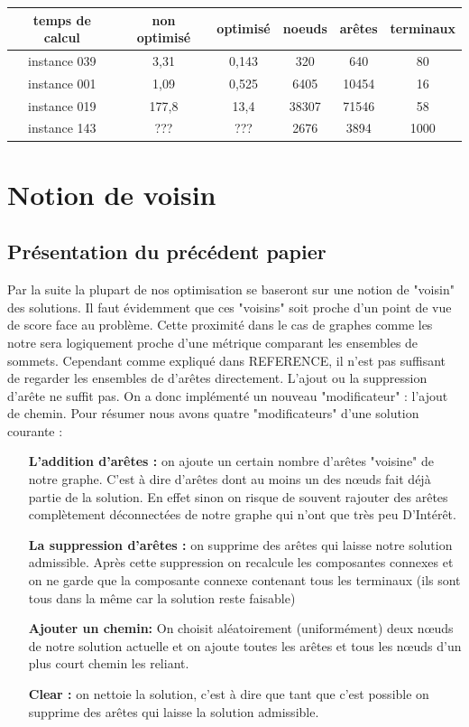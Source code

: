 \documentclass[10pt,a4paper]{article}
\begin{document}
\begin{tabular}{|c|c|c|c|c|c|}
\hline 
temps de calcul & non optimisé & optimisé & noeuds & arêtes & terminaux \\ 
\hline 
instance 039 & 3,31 & 0,143 & 320 & 640 & 80 \\ 
\hline 
instance 001 & 1,09 & 0,525 & 6405 & 10454 & 16 \\ 
\hline 
instance 019 & 177,8 & 13,4 & 38307 & 71546 & 58 \\ 
\hline 
instance 143 & ???   & ???  & 2676 & 3894 & 1000 \\
\hline 
\end{tabular} 

\section{Notion de voisin}




\subsection{Présentation du précédent papier}
Par la suite la plupart de nos optimisation se baseront sur une notion de "voisin" des solutions. Il faut évidemment que ces "voisins" soit proche d'un point de vue de score face au problème. Cette proximité dans le cas de graphes comme les notre sera logiquement proche d'une métrique comparant les ensembles de sommets. Cependant comme expliqué dans REFERENCE, il n'est pas suffisant de regarder les ensembles de d’arêtes directement. L'ajout ou la suppression d’arête ne suffit pas. On a donc implémenté un nouveau "modificateur" : l'ajout de chemin. 
Pour résumer nous avons quatre "modificateurs" d'une solution courante :
\begin{itemize}   
\item[\textbf{L'addition  d’arêtes : }] on ajoute un certain nombre d'arêtes "voisine" de notre graphe. C'est à dire d'arêtes dont au moins un des nœuds fait déjà partie de la solution. En effet sinon on risque de souvent rajouter des arêtes complètement déconnectées de notre graphe qui n'ont que très peu D’Intérêt.
\item[\textbf{La suppression d’arêtes : }] on supprime des arêtes qui laisse notre solution admissible. Après cette suppression on recalcule les composantes connexes et on ne garde que la composante connexe contenant tous les terminaux (ils sont tous dans la même car la solution reste faisable) 
\item[\textbf{Ajouter un chemin: }] On choisit aléatoirement (uniformément) deux nœuds de notre solution actuelle et on ajoute toutes les arêtes et tous les nœuds d'un plus court chemin les reliant.
\item[\textbf{Clear : }] on nettoie la solution, c'est à dire que tant que c'est possible on supprime des arêtes qui laisse la solution admissible.
\end{itemize}
\end{document}
